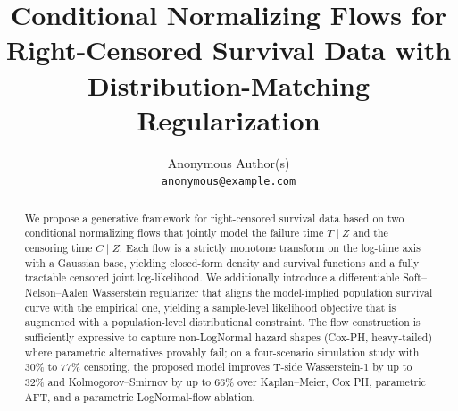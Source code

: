\documentclass{article}
\title{Conditional Normalizing Flows for\\ Right-Censored Survival Data
       with Distribution-Matching Regularization}
\author{%
  Anonymous Author(s)\\
  \texttt{anonymous@example.com}
}
\begin{document}
\maketitle

\begin{abstract}
We propose a generative framework for right-censored survival data based on
two conditional normalizing flows that jointly model the failure time
$T \mid Z$ and the censoring time $C \mid Z$. Each flow is a strictly monotone
transform on the log-time axis with a Gaussian base, yielding closed-form
density and survival functions and a fully tractable censored joint
log-likelihood. We additionally introduce a differentiable
Soft--Nelson--Aalen Wasserstein regularizer that aligns the model-implied
population survival curve with the empirical one, yielding a sample-level
likelihood objective that is augmented with a population-level distributional
constraint. The flow construction is sufficiently expressive to capture
non-LogNormal hazard shapes (Cox-PH, heavy-tailed) where parametric
alternatives provably fail; on a four-scenario simulation study with $30\%$ to
$77\%$ censoring, the proposed model improves T-side Wasserstein-1 by up to
$32\%$ and Kolmogorov--Smirnov by up to $66\%$ over Kaplan--Meier, Cox PH,
parametric AFT, and a parametric LogNormal-flow ablation.
\end{abstract}












\end{document}
